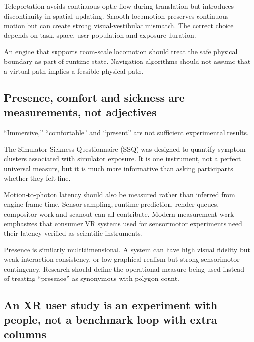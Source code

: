 Teleportation avoids continuous optic flow during translation but introduces discontinuity in spatial updating. Smooth locomotion preserves continuous motion but can create strong visual-vestibular mismatch. The correct choice depends on task, space, user population and exposure duration.

An engine that supports room-scale locomotion should treat the safe physical boundary as part of runtime state. Navigation algorithms should not assume that a virtual path implies a feasible physical path.

\subsection{Presence, comfort and sickness are measurements, not adjectives}\label{04-visual-computing-ii-ch035-presence-comfort-and-sickness-are-measurements-not-adjectives}

\hypertarget{04-visual-computing-ii-ch035-presence-comfort-and-sickness-are-measurements-not-adjectives}{}

``Immersive,'' ``comfortable'' and ``present'' are not sufficient experimental results.

The Simulator Sickness Questionnaire (SSQ) was designed to quantify symptom clusters associated with simulator exposure. It is one instrument, not a perfect universal measure, but it is much more informative than asking participants whether they felt fine.

Motion-to-photon latency should also be measured rather than inferred from engine frame time. Sensor sampling, runtime prediction, render queues, compositor work and scanout can all contribute. Modern measurement work emphasizes that consumer VR systems used for sensorimotor experiments need their latency verified as scientific instruments.

Presence is similarly multidimensional. A system can have high visual fidelity but weak interaction consistency, or low graphical realism but strong sensorimotor contingency. Research should define the operational measure being used instead of treating ``presence'' as synonymous with polygon count.

\subsection{An XR user study is an experiment with people, not a benchmark loop with extra columns}\label{04-visual-computing-ii-ch035-an-xr-user-study-is-an-experiment-with-people-not-a-benchmark-loop-with-extra-columns}

